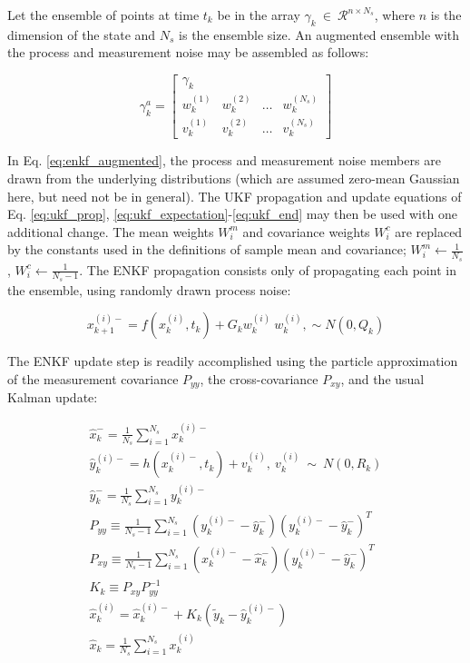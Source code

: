 \documentclass[]{article}
\begin{document}
Let the ensemble of points at time $t_k$ be in the array $\gamma_k \ \in \ \mathcal{R}^{n \times N_s}$, where $n$ is the dimension of the state and $N_s$ is the ensemble size. An augmented ensemble with the process and measurement noise may be assembled as follows:

\begin{equation}
\gamma^a_k = \begin{bmatrix}
\gamma_k \\
w^{(1)}_k & w^{(2)}_k & \dots & w^{(N_s)}_k \\
v^{(1)}_k & v^{(2)}_k & \dots & v^{(N_s)}_k
\end{bmatrix}
\label{eq:enkf_augmented}
\end{equation}

In Eq. \ref{eq:enkf_augmented}, the process and measurement noise members are drawn from the underlying distributions (which are assumed zero-mean Gaussian here, but need not be in general). The UKF propagation and update equations of Eq. \ref{eq:ukf_prop}, \ref{eq:ukf_expectation}-\ref{eq:ukf_end} may then be used with one additional change. The mean weights $W^m_i$ and covariance weights $W^c_i$ are replaced by the constants used in the definitions of sample mean and covariance; $W^m_i \leftarrow \frac{1}{N_s}$, $W^c_i \leftarrow \frac{1}{N_s-1}$. The ENKF propagation consists only of propagating each point in the ensemble, using randomly drawn process noise:

\begin{equation}
x_{k+1}^{(i)-} = f(x_{k}^{(i)},t_k) + G_k w_{k}^{(i)} \ w_k^{(i)}, \sim N(0,Q_k)
\end{equation}

The ENKF update step is readily accomplished using the particle approximation of the measurement covariance $P_{yy}$, the cross-covariance $P_{xy}$, and the usual Kalman update:

\begin{align}
\hat{x}_k^{-} = \frac{1}{N_s} \sum_{i=1}^{N_s} x_{k}^{(i)-} \\
\hat{y}_k^{(i)-} = h(x_{k}^{(i)-},t_k) + v_k^{(i)}, \ v_k^{(i)} \ \sim \ N(0,R_k) \\
\hat{y}_k^{-} = \frac{1}{N_s} \sum_{i=1}^{N_s} y_k^{(i)-} \\
P_{yy} \equiv \frac{1}{N_s-1} \sum_{i=1}^{N_s} ({y}_k^{(i)-} - \hat{y}_k^{-})({y}_k^{(i)-} - \hat{y}_k^{-})^T \\
P_{xy} \equiv \frac{1}{N_s-1} \sum_{i=1}^{N_s} ({x}_k^{(i)-} - \hat{x}_k^{-})({y}_k^{(i)-} - \hat{y}_k^{-})^T \\
K_k \equiv P_{xy} P_{yy}^{-1} \\
\hat{x}_k^{(i)} = \hat{x}_k^{(i)-} + K_k(\tilde{y}_k - \hat{y}_k^{(i)-}) \\
\hat{x}_k = \frac{1}{N_s} \sum_{i=1}^{N_s} x_{k}^{(i)} 
\label{eq:xest_enkf}  \\
\end{align}
\end{document}
